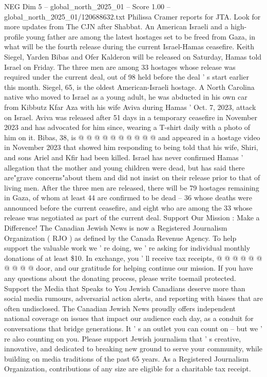 \begin{textsample}{NEG Dim 5 – global\_north\_2025\_01 – Score 1.00 – global\_north\_2025\_01/120688632.txt}  \label{ex:f5_neg_189}
Philissa Cramer reports for JTA.
Look for more updates from The CJN after Shabbat.
An American Israeli and a high-profile young father are among the latest hostages set to be freed from Gaza, in what will be the fourth release during the current Israel-Hamas ceasefire.
Keith Siegel, Yarden Bibas and Ofer Kalderon will be released on Saturday, Hamas told Israel on Friday.
The three men are among 33 hostages whose release was required under the current deal, out of 98 held before the deal ' s start earlier this month.
Siegel, 65, is the oldest American-Israeli hostage.
A North Carolina native who moved to Israel as a young adult, he was abducted in his own car from Kibbutz Kfar Aza with his wife Aviva during Hamas ' Oct. 7, 2023, attack on Israel.
Aviva was released after 51 days in a temporary ceasefire in November 2023 and has advocated for him since, wearing a T-shirt daily with a photo of him on it.
Bibas, 38, is @ @ @ @ @ @ @ @ @ @ and appeared in a hostage video in November 2023 that showed him responding to being told that his wife, Shiri, and sons Ariel and Kfir had been killed.
Israel has never confirmed Hamas ' allegation that the mother and young children were dead, but has said there are"grave concerns"about them and did not insist on their release prior to that of living men.
After the three men are released, there will be 79 hostages remaining in Gaza, of whom at least 44 are confirmed to be dead -- 36 whose deaths were announced before the current ceasefire, and eight who are among the 33 whose release was negotiated as part of the current deal.
Support Our Mission : Make a Difference!
The Canadian Jewish News is now a Registered Journalism Organization ( RJO ) as defined by the Canada Revenue Agency.
To help support the valuable work we ' re doing, we ' re asking for individual monthly donations of at least \$10.
In exchange, you ' ll receive tax receipts, @ @ @ @ @ @ @ @ @ @ door, and our gratitude for helping continue our mission.
If you have any questions about the donating process, please write toemail protected.
Support the Media that Speaks to You Jewish Canadians deserve more than social media rumours, adversarial action alerts, and reporting with biases that are often undisclosed.
The Canadian Jewish News proudly offers independent national coverage on issues that impact our audience each day, as a conduit for conversations that bridge generations.
It ' s an outlet you can count on -- but we ' re also counting on you.
Please support Jewish journalism that ' s creative, innovative, and dedicated to breaking new ground to serve your community, while building on media traditions of the past 65 years.
As a Registered Journalism Organization, contributions of any size are eligible for a charitable tax receipt.

\end{textsample}
